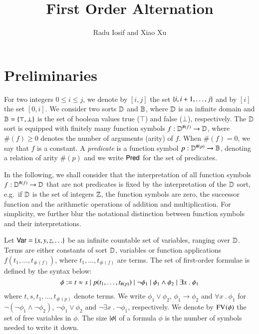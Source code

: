 \documentclass{llncs}
\begin{document}

\title{First Order Alternation}

\author{Radu Iosif and Xiao Xu}

\maketitle

\begin{abstract}
\end{abstract}

\section{Preliminaries}

For two integers $0 \leq i \leq j$, we denote by $[i,j]$ the set
$\{ i,i+1,\ldots,j \}$ and by $[i]$ the set $[0,i]$. We consider two
sorts $\mathbb{D}$ and $\mathbb{B}$, where $\mathbb{D}$ is an infinite domain and
$\mathbb{B} = \{ \top,\bot \}$ is the set of boolean values true ($\top$)
and false ($\bot$), respectively. The $\mathbb{D}$ sort is equipped with
finitely many function symbols $f : \mathbb{D}^{\#(f)} \rightarrow \mathbb{D}$,
where $\#(f)\geq0$ denotes the number of arguments (arity) of
$f$. When $\#(f)=0$, we say that $f$ is a constant. A \emph{predicate}
is a function symbol $p : \mathbb{D}^{\#(p)} \rightarrow \mathbb{B}$, denoting a
relation of arity $\#(p)$ and we write $\mathsf{Pred}$ for the set of
predicates. 

In the following, we shall consider that the interpretation of all
function symbols $f : \mathbb{D}^{\#(f)} \rightarrow \mathbb{D}$ that are not
predicates is fixed by the interpretation of the $\mathbb{D}$ sort,
e.g.\ if $\mathbb{D}$ is the set of integers ${\bf \mathbb{Z}}$, the function symbols
are zero, the successor function and the arithmetic operations of
addition and multiplication. For simplicity, we further blur the
notational distinction between function symbols and their
interpretations.

Let $\mathsf{Var} = \{ x,y,z,\ldots \}$ be an infinite countable set of
variables, ranging over $\mathbb{D}$. Terms are either constants of sort
$\mathbb{D}$, variables or function applications $f(t_1,\ldots,t_{\#(f)})$,
where $t_1,\ldots,t_{\#(f)}$ are terms. The set of first-order
formulae is defined by the syntax below:
\[\phi := t \approx s \mid p(t_1,\ldots,t_{\#(p)}) 
\mid \neg \phi_1 \mid \phi_1 \wedge \phi_2 \mid \exists x ~.~
\phi_1 \] where $t,s,t_1,\ldots,t_{\#(p)}$ denote terms. We write
$\phi_1 \vee \phi_2$, $\phi_1 \rightarrow \phi_2$ and $\forall x ~.~
\phi_1$ for $\neg(\neg\phi_1 \wedge \neg\phi_2)$, $\neg\phi_1 \vee
\phi_2$ and $\neg\exists x ~.~ \neg\phi_1$, respectively. We denote by
$\mathrm{FV}_{}(\phi)$ the set of free variables in $\phi$. The size
${|{\phi}|}$ of a formula $\phi$ is the number of symbols needed to
write it down.
\end{document}
